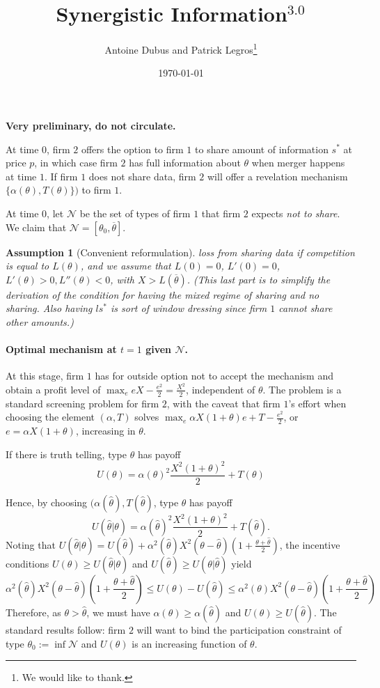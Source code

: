 \documentclass[a4paper]{article}
\newtheorem{ass}{Assumption}
\newcommand{\N}{\mathcal N}
\renewcommand{\th}{\hat\theta}
\renewcommand{\t}{\theta}
\renewcommand{\a}{\alpha}
\begin{document}
\title{Synergistic Information$^{3.0}$}
\author{Antoine Dubus and Patrick Legros\thanks{We would like to thank.}}
\date{\today}


\maketitle

 
\textbf{Very preliminary, do not circulate.}

\baselineskip0.7cm


At time $0$, firm $2$ offers the option to firm $1$ to share amount of information $s^*$ at price $p$, in which case firm $2$ has full information about $\t$ when merger happens at time $1$. If firm $1$ does not share data, firm $2$ will offer a revelation mechanism $\{\alpha(\t),T(\t)\})$ to firm $1$.

At time $0$, let $\N$ be the set of types of firm $1$ that firm $2$ expects \emph{not to share}. We claim that $\N=[\t_0,\overline \t]$.

\begin{ass}[Convenient reformulation]\label{ass:L} loss from sharing data if competition is equal to $L(\t)$, and we assume that $L(0)=0$, $L'(0)=0$, $L'(\t)>0,L''(\t)<0$, with $X>L(\overline \t)$. (This last part is to simplify the derivation of the condition for having the mixed regime of sharing and no sharing. Also having $l s^*$ is sort of window dressing since firm $1$ cannot share other amounts.)
\end{ass}
 
\paragraph{Optimal mechanism at $t=1$ given $\N$.} At this stage, firm $1$ has for outside option not to accept the mechanism and obtain a profit level of $\max_e eX -\frac{e^2}{2}=\frac{X^2}{2}$, independent of $\t$. The problem is a standard screening problem for firm $2$, with the caveat that firm $1$'s effort when choosing the element $(\alpha,T)$ solves $\max_e  \alpha X(1+\t) e +T-\frac{e^2}{2}$, or $e=\a X(1+\t)$, increasing in $\t$. 

If there is truth telling, type $\t$ has payoff
%
\[
U(\t)=\alpha(\t)^2 \frac{X^2(1+\t)^2}{2}+T(\t)
\]
%

Hence, by choosing $(\alpha(\th),T(\th)$, type $\t$ has payoff
%
\[
U(\th|\t)=\alpha(\th)^2 \frac{X^2(1+\t)^2}{2}+T(\th).
\]
%
Noting that $U(\th|\t)=U(\th)+\a^2(\th)X^2(\t-\th)\left(1+\frac{\t+\th}{2}\right)$, the incentive conditions $U(\t)\geq U(\th|\t)$ and $U(\th)\geq U(\t|\th)$ yield
%
\[
\a^2(\hat \t) X^2(\t-\th)\left(1+\frac{\t+\th}{2}\right)   \leq U(\t)-U(\th) \leq \a^2(\t)X^2(\t-\th)\left(1+\frac{\t+\th}{2}\right) 
\]
%
Therefore, as $\t>\th$, we must have $\a(\t)\geq \a(\th)$ and $U(\t)\geq U(\th)$.  The standard results follow: firm $2$ will want to bind the participation constraint of type $\t_0:=\inf \N$ and $U(\t)$ is an increasing function of $\t$.
\end{document}
